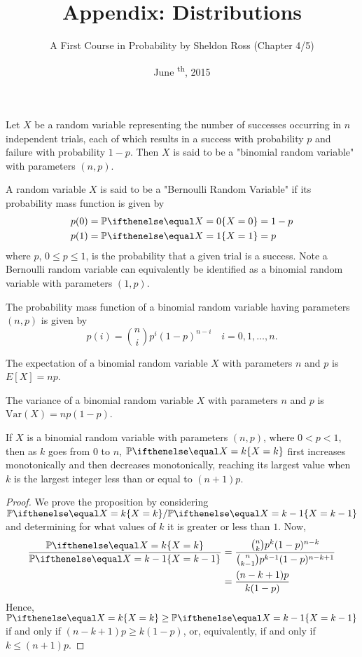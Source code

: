 \documentclass[a4paper,8pt]{article}
\title{Appendix: Distributions}
\author{A First Course in Probability by Sheldon Ross (Chapter 4/5)}
\date{June \textsuperscript{th}, 2015}
\begin{document}
\maketitle
{}

\begin{outline}

    Let \(X\) be a random variable representing the number of successes occurring in \(n\) independent trials,
    each of which results in a success with probability \(p\) and failure with probability \(1-p\). Then
    \(X\) is said to be a "binomial random variable" with parameters \((n, p)\).

    A random variable \(X\) is said to be a "Bernoulli Random Variable" if its probability mass function is given by
    \begin{align*}
      p(0) &= \bbp[X=0] = 1 - p \\
      p(1) &= \bbp[X=1] = p
    \end{align*}
    where \(p\), \(0 \leq p \leq 1\), is the probability that a given trial is a success. Note a Bernoulli random
    variable can equivalently be identified as a binomial random variable with parameters \((1, p)\).

    The probability mass function of a binomial random variable having parameters \((n, p)\) is given by
    \[ p(i) = \binom{n}{i}p^i(1-p)^{n-i}\quad i=0,1,\ldots,n\text{.} \]

    The expectation of a binomial random variable \(X\) with parameters \(n\) and \(p\) is \(E[X] = np\).

    The variance of a binomial random variable \(X\) with parameters \(n\) and \(p\) is \(\text{Var}(X) = np(1-p)\).

    If \(X\) is a binomial random variable with parameters \((n, p)\), where \(0 < p < 1\), then as \(k\) goes
    from \(0\) to \(n\), \(\bbp[X=k]\) first increases monotonically and then decreases monotonically, reaching
    its largest value when \(k\) is the largest integer less than or equal to \((n+1)p\).

    \begin{proof}
      We prove the proposition by considering \(\bbp[X=k]/\bbp[X=k-1]\) and determining for what values of
      \(k\) it is greater or less than \(1\). Now,
      \begin{align}
        \frac{\bbp[X=k]}{\bbp[X=k-1]} &= \frac{\binom{n}{k}p^k(1-p)^{n-k}}
                                              {\binom{n}{k-1}p^{k-1}(1-p)^{n-k+1}}\nonumber \\
                                      &= \frac{(n-k+1)p}{k(1-p)}
      \end{align}
      Hence, \(\bbp[X=k] \geq \bbp[X=k-1]\) if and only if \((n-k+1)p \geq k(1-p)\), or, equivalently, if and only
      if \(k \leq (n+1)p\).
    \end{proof}


\end{outline}
\end{document}

